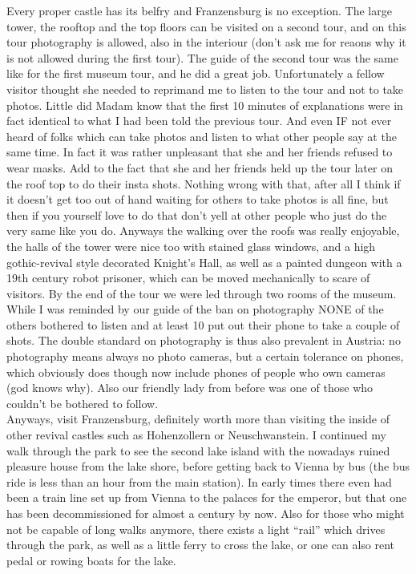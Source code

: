 { Every proper castle has its belfry and Franzensburg is no exception. The large tower, the rooftop and the top floors can be visited on a second tour, and on this tour photography is allowed, also in the interiour (don't ask me for reaons why it is not allowed during the first tour). The guide of the second tour was the same like for the first museum tour, and he did a great job. Unfortunately a fellow visitor thought she needed to reprimand me to listen to the tour and not to take photos. Little did Madam know that the first 10 minutes of explanations were in fact identical to what I had been told the previous tour. And even IF not ever heard of folks which can take photos and listen to what other people say at the same time. In fact it was rather unpleasant that she and her friends refused to wear masks. Add to the fact that she and her friends held up the tour later on the roof top to do their insta shots. Nothing wrong with that, after all I think if it doesn't get too out of hand waiting for others to take photos is all fine, but then if you yourself love to do that don't yell at other people who just do the very same like you do. Anyways the walking over the roofs was really enjoyable, the halls of the tower were nice too with stained glass windows, and a high gothic-revival style decorated Knight's Hall, as well as a painted dungeon with a 19th century robot prisoner, which can be moved mechanically to scare of visitors. By the end of the tour we were led through two rooms of the museum. While I was reminded by our guide of the ban on photography NONE of the others bothered to listen and at least 10 put out their phone to take a couple of shots. The double standard on photography is thus also prevalent in Austria: no photography means always no photo cameras, but a certain tolerance on phones, which obviously does though now include phones of people who own cameras (god knows why). Also our friendly lady from before was one of those who couldn't be bothered to follow. \\
 Anyways, visit Franzensburg, definitely worth more than visiting the inside of other revival castles such as Hohenzollern or Neuschwanstein. I continued my walk through the park to see the second lake island with the nowadays ruined pleasure house from the lake shore, before getting back to Vienna by bus (the bus ride is less than an hour from the main station). In early times there even had been a train line set up from Vienna to the palaces for the emperor, but that one has been decommissioned for almost a century by now. Also for those who might not be capable of long walks anymore, there exists a light ``rail'' which drives through the park, as well as a little ferry to cross the lake, or one can also rent pedal or rowing boats for the lake.\\

}
